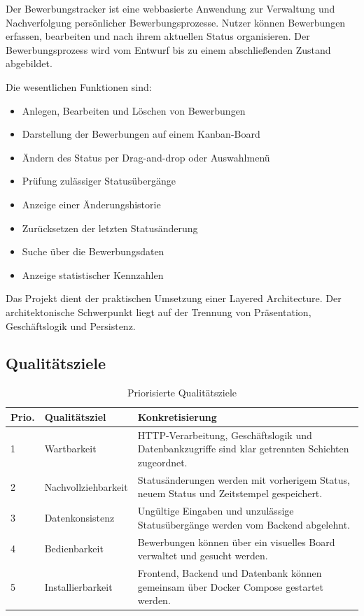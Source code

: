 \documentclass[a4paper,11pt]{article}
\begin{document}
Der Bewerbungstracker ist eine webbasierte Anwendung zur Verwaltung und Nachverfolgung persönlicher Bewerbungsprozesse.
Nutzer können Bewerbungen erfassen, bearbeiten und nach ihrem aktuellen Status organisieren.
Der Bewerbungsprozess wird vom Entwurf bis zu einem abschließenden Zustand abgebildet.

Die wesentlichen Funktionen sind:

\begin{itemize}
  \item Anlegen, Bearbeiten und Löschen von Bewerbungen
  \item Darstellung der Bewerbungen auf einem Kanban-Board
  \item Ändern des Status per Drag-and-drop oder Auswahlmenü
  \item Prüfung zulässiger Statusübergänge
  \item Anzeige einer Änderungshistorie
  \item Zurücksetzen der letzten Statusänderung
  \item Suche über die Bewerbungsdaten
  \item Anzeige statistischer Kennzahlen
\end{itemize}

Das Projekt dient der praktischen Umsetzung einer Layered Architecture.
Der architektonische Schwerpunkt liegt auf der Trennung von Präsentation, Geschäftslogik und Persistenz.

\subsection{Qualitätsziele}

\begin{table}[H]
\centering
\begin{tabularx}{\textwidth}{L{1.8cm} L{3.2cm} Y}
\toprule
\textbf{Prio.} & \textbf{Qualitätsziel} & \textbf{Konkretisierung} \\
 & Wartbarkeit & HTTP-Verarbeitung, Geschäftslogik und Datenbankzugriffe sind klar getrennten Schichten zugeordnet. \\
2 & Nachvollziehbarkeit & Statusänderungen werden mit vorherigem Status, neuem Status und Zeitstempel gespeichert. \\
3 & Datenkonsistenz & Ungültige Eingaben und unzulässige Statusübergänge werden vom Backend abgelehnt. \\
4 & Bedienbarkeit & Bewerbungen können über ein visuelles Board verwaltet und gesucht werden. \\
5 & Installierbarkeit & Frontend, Backend und Datenbank können gemeinsam über Docker Compose gestartet werden. \\
\bottomrule
\end{tabularx}
\caption{Priorisierte Qualitätsziele}
\label{tab:quality-goals}
\end{table}
\end{document}

